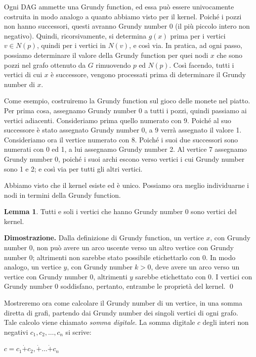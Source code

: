 \documentclass[a4paper, 10pt]{report}
\newenvironment{dimostrazione}{\textbf{Dimostrazione.} }{ \qed}
\theoremstyle{definition} %
\newtheorem{lemma}{Lemma}
\begin{document}
Ogni DAG ammette una Grundy function, ed essa può essere univocamente costruita in modo analogo a quanto abbiamo visto per il kernel.
Poich\'e i pozzi non hanno successori, questi avranno Grundy number 0 (il
pi\`u piccolo intero non negativo). Quindi, ricorsivamente, si determina $g(x)$
prima per i vertici $v \in N(p)$, quindi per i vertici in $N(v)$, e cos\`i
via. In pratica, ad ogni passo, possiamo determinare il valore della Grundy
function per quei nodi $x$ che sono pozzi nel grafo ottenuto da $G$
rimuovendo $p$ ed $N(p)$.
Cos\`i facendo, tutti i vertici di cui $x$ \`e successore, vengono processati
prima di determinare il Grundy number di $x$.

Come esempio, costruiremo la Grundy function sul gioco delle monete nel
piatto. Per prima cosa, assegnamo Grundy number 0 a tutti i pozzi, quindi
passiamo ai vertici adiacenti. Consideriamo prima quello numerato con
9. Poich\'e al suo successore \`e stato assegnato Grundy number 0, a 9 verr\`a
assegnato il valore 1. Consideriamo ora il vertice numerato con 8. Poich\'e i
suoi due successori sono numerati con 0 ed 1, a lui assegnamo Grundy number
2. Al vertice 7 assegnamo Grundy number 0, poich\'e i suoi archi escono verso
vertici i cui Grundy number sono 1 e 2; e cos\`i via per tutti gli altri
vertici.
\newline

Abbiamo visto che il kernel esiste ed \`e unico. Possiamo ora meglio
individuarne i nodi in termini della Grundy function.

\begin{lemma}
Tutti e soli i vertici che hanno Grundy number 0 sono vertici del kernel.
\end{lemma}

\begin{dimostrazione}
Dalla definizione di Grundy function, un vertice $x$, con
Grundy number 0, non pu\`o avere un arco uscente verso un altro vertice con
Grundy number 0; altrimenti non sarebbe stato possibile etichettarlo con 0. In
modo analogo, un vertice $y$, con Grundy number $k>0$, deve avere un arco
verso un vertice con Grundy number 0, altrimenti $y$ sarebbe etichettato con 0.
I vertici con Grundy number 0 soddisfano, pertanto, entrambe le propriet\`a del
kernel.
\end{dimostrazione}
\newline

Mostreremo ora come calcolare il Grundy number di un vertice, in una somma
diretta di grafi, partendo dai  Grundy number dei singoli vertici di ogni
grafo. Tale calcolo viene chiamato \emph{somma digitale}.
\newline
La somma digitale $c$ degli interi non negativi $c_1, c_2, \ldots, c_n$
si scrive:
\begin{center}
  $c=c_1 \dot{+} c_2, \dot{+} \ldots \dot{+} c_n$
\end{center}
\end{document}
